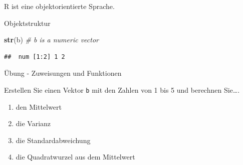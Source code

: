 \documentclass[ignorenonframetext,]{beamer}
\newenvironment{Shaded}{\begin{snugshade}}{\end{snugshade}}
\newcommand{\KeywordTok}[1]{\textcolor[rgb]{0.26,0.66,0.93}{\textbf{#1}}}
\newcommand{\CommentTok}[1]{\textcolor[rgb]{0.00,0.40,1.00}{\textit{#1}}}
\newcommand{\NormalTok}[1]{\textcolor[rgb]{0.74,0.68,0.62}{#1}}
\begin{document}
\begin{frame}[fragile]{R ist eine objektorientierte Sprache.}
\begin{block}{Objektstruktur}

\begin{Shaded}
\begin{Highlighting}[]
\KeywordTok{str}\NormalTok{(b) }\CommentTok{# b is a numeric vector}
\end{Highlighting}
\end{Shaded}

\begin{verbatim}
##  num [1:2] 1 2
\end{verbatim}

\end{block}

\end{frame}

\begin{frame}[fragile]{Übung - Zuweisungen und Funktionen}

Erstellen Sie einen Vektor \texttt{b} mit den Zahlen von 1 bis 5 und
berechnen Sie\ldots{}.

\begin{enumerate}
\def\labelenumi{\arabic{enumi}.}
\item
  den Mittelwert
\item
  die Varianz
\item
  die Standardabweichung
\item
  die Quadratwurzel aus dem Mittelwert
\end{enumerate}

\end{frame}
\end{document}
